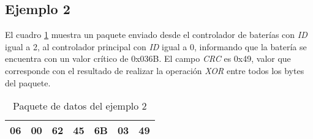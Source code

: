 \documentclass[a4paper,10pt]{article}
\begin{document}
\subsection{Ejemplo 2}
\label{ejemplo2}

El cuadro \ref{paquete_ejemplo2} muestra un paquete enviado desde el controlador de bater\'ias con \emph{ID} igual a 2,
al controlador principal con \emph{ID} igual a 0, informando que la bater\'ia se encuentra con un valor cr\'itico de 0x036B.
El campo \emph{CRC} es 0x49, valor que corresponde con el resultado de realizar la operaci\'on \emph{XOR} entre
todos los bytes del paquete.

\begin{table}[h]
\begin{center}
\begin{tabular}{|c|c|c|c|c|c|c|}
\hline
06 & 00 & 62 & 45 & 6B & 03 & 49 \\
\hline
\end{tabular}
\caption{Paquete de datos del ejemplo 2}
\label{paquete_ejemplo2}
\end{center}
\end{table}
\end{document}

